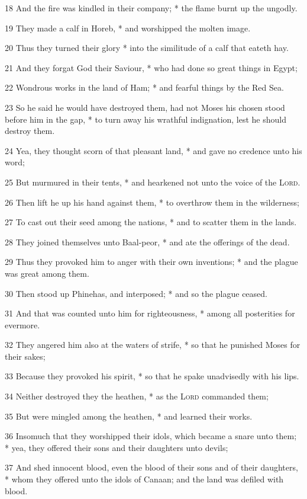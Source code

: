 18 And the fire was kindled in their company; * the flame burnt up the ungodly.\par
19 They made a calf in Horeb, * and worshipped the molten image.\par
20 Thus they turned their glory * into the similitude of a calf that eateth hay.\par
21 And they forgat God their Saviour, * who had done so great things in Egypt;\par
22 Wondrous works in the land of Ham; * and fearful things by the Red Sea.\par
23 So he said he would have destroyed them, had not Moses his chosen stood before him in the gap, * to turn away his wrathful indignation, lest he should destroy them.\par
24 Yea, they thought scorn of that pleasant land, * and gave no credence unto his word;\par
25 But murmured in their tents, * and hearkened not unto the voice of the {\textsc{Lord}}.\par
26 Then lift he up his hand against them, * to overthrow them in the wilderness;\par
27 To cast out their seed among the nations, * and to scatter them in the lands.\par
28 They joined themselves unto Baal-peor, * and ate the offerings of the dead.\par
29 Thus they provoked him to anger with their own inventions; * and the plague was great among them.\par
30 Then stood up Phinehas, and interposed; * and so the plague ceased.\par
31 And that was counted unto him for righteousness, * among all posterities for evermore.\par
32 They angered him also at the waters of strife, * so that he punished Moses for their sakes;\par
33 Because they provoked his spirit, * so that he spake unadvisedly with his lips.\par
34 Neither destroyed they the heathen, * as the {\textsc{Lord}} commanded them;\par
35 But were mingled among the heathen, * and learned their works.\par
36 Insomuch that they worshipped their idols, which became a snare unto them; * yea, they offered their sons and their daughters unto devils;\par
37 And shed innocent blood, even the blood of their sons and of their daughters, * whom they offered unto the idols of Canaan; and the land was defiled with blood.\par
